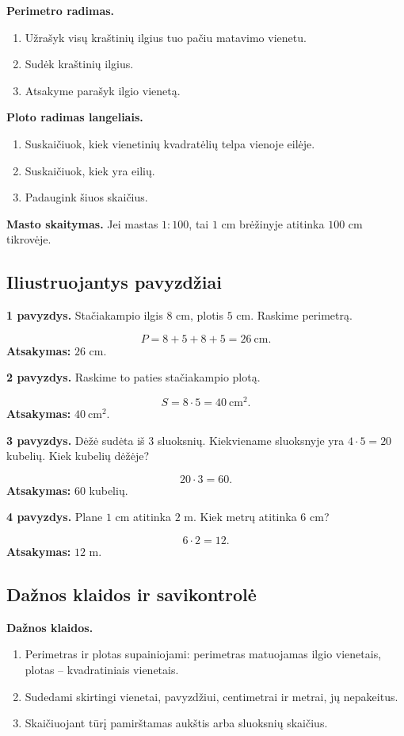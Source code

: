 \textbf{Perimetro radimas.}
\begin{enumerate}[label=\arabic*.]
\item Užrašyk visų kraštinių ilgius tuo pačiu matavimo vienetu.
\item Sudėk kraštinių ilgius.
\item Atsakyme parašyk ilgio vienetą.
\end{enumerate}

\textbf{Ploto radimas langeliais.}
\begin{enumerate}[label=\arabic*.]
\item Suskaičiuok, kiek vienetinių kvadratėlių telpa vienoje eilėje.
\item Suskaičiuok, kiek yra eilių.
\item Padaugink šiuos skaičius.
\end{enumerate}

\textbf{Masto skaitymas.}
Jei mastas \(1:100\), tai \(1\) cm brėžinyje atitinka \(100\) cm tikrovėje.

\subsection{Iliustruojantys pavyzdžiai}

\textbf{1 pavyzdys.} Stačiakampio ilgis \(8\) cm, plotis \(5\) cm. Raskime perimetrą.

\[
P=8+5+8+5=26\ \text{cm}.
\]
\textbf{Atsakymas:} \(26\) cm.

\textbf{2 pavyzdys.} Raskime to paties stačiakampio plotą.

\[
S=8\cdot5=40\ \text{cm}^2.
\]
\textbf{Atsakymas:} \(40\ \text{cm}^2\).

\textbf{3 pavyzdys.} Dėžė sudėta iš \(3\) sluoksnių. Kiekviename sluoksnyje yra \(4\cdot5=20\) kubelių. Kiek kubelių dėžėje?

\[
20\cdot3=60.
\]
\textbf{Atsakymas:} \(60\) kubelių.

\textbf{4 pavyzdys.} Plane \(1\) cm atitinka \(2\) m. Kiek metrų atitinka \(6\) cm?

\[
6\cdot2=12.
\]
\textbf{Atsakymas:} \(12\) m.

\subsection{Dažnos klaidos ir savikontrolė}

\textbf{Dažnos klaidos.}
\begin{enumerate}[label=\arabic*.]
\item Perimetras ir plotas supainiojami: perimetras matuojamas ilgio vienetais, plotas -- kvadratiniais vienetais.
\item Sudedami skirtingi vienetai, pavyzdžiui, centimetrai ir metrai, jų nepakeitus.
\item Skaičiuojant tūrį pamirštamas aukštis arba sluoksnių skaičius.
\end{enumerate}

